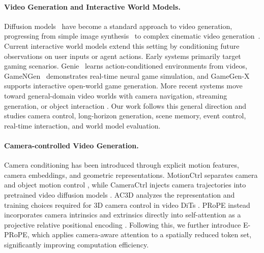 \documentclass{llmxive}
\providecommand{\eprope}{E-PRoPE}
\begin{document}
\paragraph{\bf{Video Generation and Interactive World Models.}}
Diffusion models~\citep{ho2020denoising, song2021scorebasedgenerativemodelingstochastic, peebles2023scalable, song2021scorebasedgenerativemodelingstochastic} have become a standard approach to video generation, progressing
from simple image synthesis~\citep{Chu_2025_ICCV, lei2023maskeddiffusionmodelsfast, lei2026vaeendtoendpixelspacegenerative} to complex cinematic video generation~\citep{wan2025wan, feng2026enhancing}.
Current interactive world models extend this setting by conditioning future observations
on user inputs or agent actions. Early systems primarily target gaming scenarios.
Genie~\citep{bruce2024genie} learns action-conditioned environments from videos, GameNGen~\citep{valevski2024gamengen} demonstrates real-time neural game simulation, and GameGen-X~\citep{che2025gamegen} supports interactive open-world game
generation. More recent systems move toward
general-domain video worlds with camera navigation, streaming generation, or
object interaction
\citep{hyworld2025,gao2026lingbotworld,hong2025relic,
wang2026matrixgame,zhao2026minwm,gu2026worldcraft}.
Our work follows this general direction and studies camera control,
long-horizon generation, scene memory, event control, real-time interaction, and world model evaluation.

\paragraph{\bf{Camera-controlled Video Generation.}}
Camera conditioning has been introduced through explicit motion features,
camera embeddings, and geometric representations. MotionCtrl separates camera
and object motion control \citep{wang2024motionctrl}, while CameraCtrl injects
camera trajectories into pretrained video diffusion models
\citep{he2025cameractrl}. AC3D analyzes the representation and training choices
required for 3D camera control in video DiTs \citep{bahmani2025ac3d}. PRoPE
instead incorporates camera intrinsics and extrinsics directly into
self-attention as a projective relative positional encoding
\citep{li2025cameras}. Following this, 
we further introduce \eprope{}, which applies camera-aware attention to a spatially reduced token set, significantly improving computation efficiency.
\end{document}
